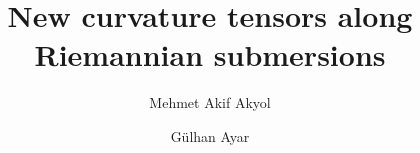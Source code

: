 \documentclass{birkjour}
\theoremstyle{definition}
\theoremstyle{remark}
\numberwithin{equation}{section}
\begin{document}
%
%
%
%
%
%
%
%
%


\title[New curvature tensors along Riemannian submersion]
{New curvature tensors along Riemannian submersions}



\author[M. A. Akyol]{Mehmet Akif Akyol}
\address{Bingol University\\ Faculty of Arts and Sciences,\\ Department of Mathematics\\ 12000, Bing\"{o}l, Turkey}
\author[G. Ayar]{G\"{u}lhan Ayar}
\address{Karaman Mehmet Bey University\\ Department of Mathematics \\ 70000, Karaman, Turkey}



\end{document}
